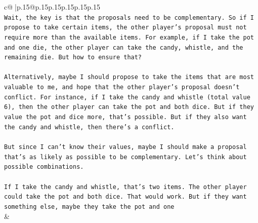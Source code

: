 \documentclass{article}
\begin{document}
{\begin{supertabular}{c@{$\;$}|p{.15\linewidth}@{}p{.15\linewidth}p{.15\linewidth}p{.15\linewidth}p{.15\linewidth}p{.15\linewidth}}
{{{\\ 
\texttt{Wait, the key is that the proposals need to be complementary. So if I propose to take certain items, the other player's proposal must not require more than the available items. For example, if I take the pot and one die, the other player can take the candy, whistle, and the remaining die. But how to ensure that?} \\
\\ 
\texttt{Alternatively, maybe I should propose to take the items that are most valuable to me, and hope that the other player's proposal doesn't conflict. For instance, if I take the candy and whistle (total value 6), then the other player can take the pot and both dice. But if they value the pot and dice more, that's possible. But if they also want the candy and whistle, then there's a conflict.} \\
\\ 
\texttt{But since I can't know their values, maybe I should make a proposal that's as likely as possible to be complementary. Let's think about possible combinations.} \\
\\ 
\texttt{If I take the candy and whistle, that's two items. The other player could take the pot and both dice. That would work. But if they want something else, maybe they take the pot and one} \\
            }
        }
    }
    & \\ \\


\end{supertabular}}
\end{document}
